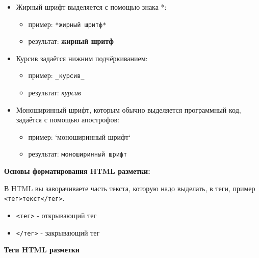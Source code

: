 \documentclass[
]{book}
\providecommand{\tightlist}{%
  \setlength{\itemsep}{0pt}\setlength{\parskip}{0pt}}
\begin{document}
\begin{itemize}
\tightlist
\item
  Жирный шрифт выделяется с помощью знака *:

  \begin{itemize}
  \tightlist
  \item
    пример: \texttt{*жирный\ шритф*}
  \item
    результат: \textbf{жирный шритф}
  \end{itemize}
\item
  Курсив задаётся нижним подчёркиванием:

  \begin{itemize}
  \tightlist
  \item
    пример: \texttt{\_курсив\_}
  \item
    результат: \emph{курсив}
  \end{itemize}
\item
  Моноширинный шрифт, которым обычно выделяется программный код, задаётся с помощью апострофов:

  \begin{itemize}
  \tightlist
  \item
    пример: `моноширинный шрифт`
  \item
    результат: \texttt{моноширинный\ шрифт}
  \end{itemize}
\end{itemize}

\textbf{Основы форматирования HTML разметки:}

В HTML вы заворачиваете часть текста, которую надо выделать, в теги, пример \texttt{\textless{}тег\textgreater{}текст\textless{}/тег\textgreater{}}.

\begin{itemize}
\tightlist
\item
  \texttt{\textless{}тег\textgreater{}} - открывающий тег
\item
  \texttt{\textless{}/тег\textgreater{}} - закрывающий тег
\end{itemize}

\textbf{Теги HTML разметки}
\end{document}
